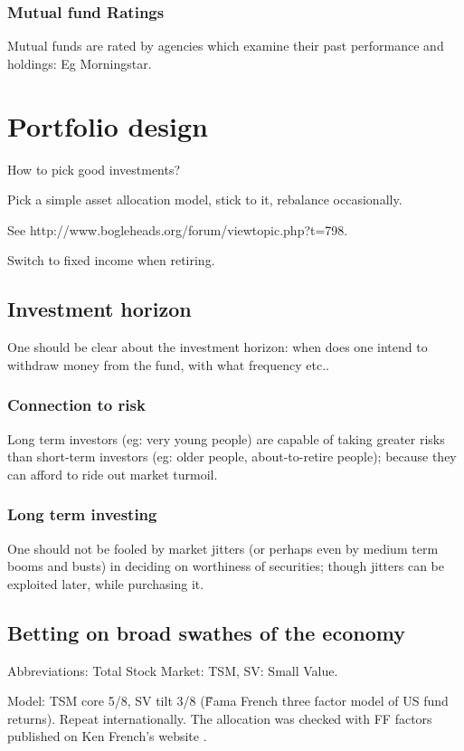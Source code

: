 \documentclass[oneside, article]{memoir}
\begin{document}
\subsubsection{Mutual fund Ratings}
Mutual funds are rated by agencies which examine their past performance and holdings: Eg Morningstar.

\section{Portfolio design}
How to pick good investments?

Pick a simple asset allocation model, stick to it, rebalance occasionally.

See http://www.bogleheads.org/forum/viewtopic.php?t=798﻿.

Switch to fixed income when retiring.

\subsection{Investment horizon}
One should be clear about the investment horizon: when does one intend to withdraw money from the fund, with what frequency etc..

\subsubsection{Connection to risk}
Long term investors (eg: very young people) are capable of taking greater risks than short-term investors (eg: older people, about-to-retire people); because they can afford to ride out market turmoil.

\subsubsection{Long term investing}
One should not be fooled by market jitters (or perhaps even by medium term booms and busts) in deciding on worthiness of securities; though jitters can be exploited later, while purchasing it.

\subsection{Betting on broad swathes of the economy}
Abbreviations: Total Stock Market: TSM, SV: Small Value.

Model: TSM core 5/8, SV tilt 3/8 (\~ Fama French three factor model of US fund returns). Repeat internationally. The allocation was checked with FF factors published on Ken French's website .
\end{document}
